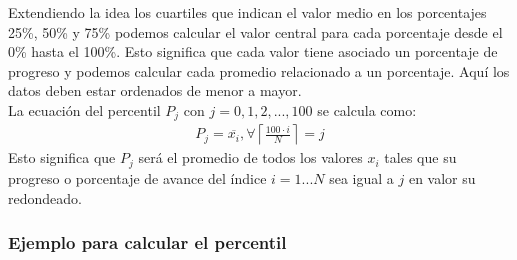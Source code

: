 \documentclass{article}
\begin{document}
Extendiendo la idea los cuartiles que indican el valor medio en los porcentajes 25\%, 50\% y 75\% podemos calcular el valor central para cada porcentaje desde el 0\% hasta el 100\%. Esto significa que cada valor tiene asociado un porcentaje de progreso y podemos calcular cada promedio relacionado a un porcentaje. Aquí los datos deben estar ordenados de menor a mayor.
\\[12pt]
La ecuación del percentil $P_j$ con $j=0, 1, 2, ..., 100$ se calcula como:
\begin{equation}
    \begin{aligned}
        P_j = \overline{x_i}, \forall \left \lceil \frac{100 \cdot i}{N} \right \rceil = j
    \end{aligned}
    \label{eq:percentil}
\end{equation}
Esto significa que $P_j$ será el promedio de todos los valores $x_i$ tales que su progreso o porcentaje de avance del índice $i=1...N$ sea igual a $j$ en valor su redondeado.

\subsubsection{Ejemplo para calcular el percentil}
\end{document}
